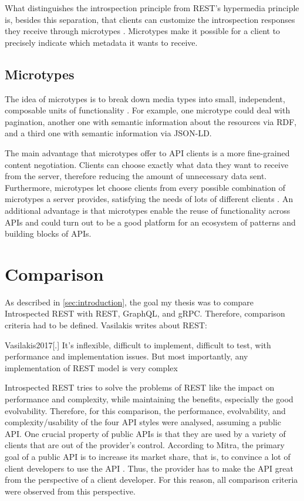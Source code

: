 What distinguishes the introspection principle from REST's hypermedia principle is, besides this separation, that clients can customize the introspection responses they receive through microtypes \autocite[sec.~9.3.1]{Vasilakis2017}. Microtypes make it possible for a client to precisely indicate which metadata it wants to receive.

\subsection{Microtypes}
The idea of microtypes is to break down media types into small, independent, composable units of functionality \autocite[sec.~9.2]{Vasilakis2017}. For example, one microtype could deal with pagination, another one with semantic information about the resources via RDF, and a third one with semantic information via JSON-LD\@.

The main advantage that microtypes offer to API clients is a more fine-grained content negotiation. Clients can choose exactly what data they want to receive from the server, therefore reducing the amount of unnecessary data sent. Furthermore, microtypes let choose clients from every possible combination of microtypes a server provides, satisfying the needs of lots of different clients \autocite[sec.~9.2.1.1]{Vasilakis2017}. An additional advantage is that microtypes enable the reuse of functionality across APIs \autocite[sec.~9.2.1.2]{Vasilakis2017} and could turn out to be a good platform for an ecosystem of patterns and building blocks of APIs.

\section{Comparison}\label{sec:comparison}

As described in \cref{sec:introduction}, the goal my thesis was to compare Introspected REST with REST, GraphQL, and gRPC\@. Therefore, comparison criteria had to be defined. Vasilakis writes about REST\@:

\begin{displaycquote}[][sec.~2]{Vasilakis2017}[.]
  It's inflexible, difficult to implement, difficult to test, with performance and implementation issues. But most importantly, any implementation of REST model is very complex
\end{displaycquote}

\noindent{}Introspected REST tries to solve the problems of REST like the impact on performance and complexity, while maintaining the benefits, especially the good evolvability. Therefore, for this comparison, the performance, evolvability, and complexity/usability of the four API styles were analysed, assuming a public API. One crucial property of public APIs is that they are used by a variety of clients \autocite[S.~7]{Jacobson2011} that are out of the provider's control. According to Mitra, the primary goal of a public API is to increase its market share, that is, to convince a lot of client developers to use the API \autocite[06:47--07:03]{Mitra2013}. Thus, the provider has to make the API great from the perspective of a client developer. For this reason, all comparison criteria were observed from this perspective.

